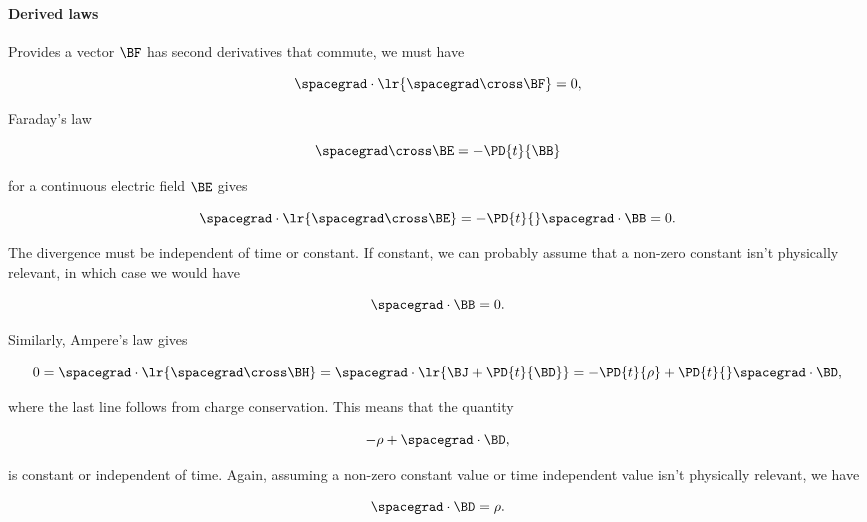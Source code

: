 \paragraph{Derived laws}

Provides a vector \( \BF \) has second derivatives that commute, we must have

\begin{dmath}\label{eqn:uwavesLecture1:440}
\spacegrad \cdot \lr{ \spacegrad \cross \BF } = 0,
\end{dmath}

Faraday's law

\begin{dmath}\label{eqn:uwavesLecture1:460}
\spacegrad \cross \BE = -\PD{t}{\BB}
\end{dmath}

for a continuous electric field \( \BE \) gives

\begin{dmath}\label{eqn:uwavesLecture1:480}
\spacegrad \cdot \lr{ \spacegrad \cross \BE } = -\PD{t}{} \spacegrad \cdot \BB = 0.
\end{dmath}

The divergence must be independent of time or constant.  If constant, we can probably assume that a non-zero constant isn't physically relevant, in which case we would have

\begin{dmath}\label{eqn:uwavesLecture1:500}
\spacegrad \cdot \BB = 0.
\end{dmath}

Similarly, Ampere's law gives

\begin{dmath}\label{eqn:uwavesLecture1:520}
0 = \spacegrad \cdot \lr{ \spacegrad \cross \BH }
= \spacegrad \cdot \lr{ \BJ + \PD{t}{\BD} }
= - \PD{t}{\rho} + \PD{t}{} \spacegrad \cdot \BD,
\end{dmath}

where the last line follows from charge conservation.  This means that the quantity

\begin{dmath}\label{eqn:uwavesLecture1:540}
-\rho + \spacegrad \cdot \BD,
\end{dmath}

is constant or independent of time.  Again, assuming a non-zero constant value or time independent value isn't physically relevant, we have

\begin{dmath}\label{eqn:uwavesLecture1:560}
\spacegrad \cdot \BD = \rho.
\end{dmath}

